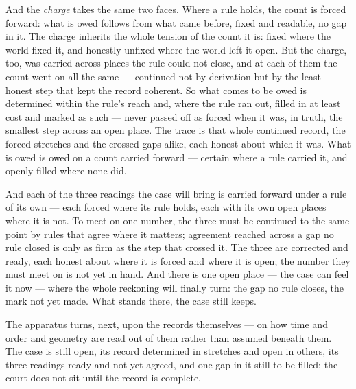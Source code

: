 And the \emph{charge} takes the same two faces. Where a rule holds, the count is forced forward: what is owed
follows from what came before, fixed and readable, no gap in it. The charge inherits the whole tension of the
count it is: fixed where the world fixed it, and honestly unfixed where the world left it open. But the charge, too, was carried across places
the rule could not close, and at each of them the count went on all the same --- continued not by derivation but
by the least honest step that kept the record coherent. So what comes to be owed is determined within the rule's
reach and, where the rule ran out, filled in at least cost and marked as such --- never passed off as forced
when it was, in truth, the smallest step across an open place. The trace is that whole continued record, the
forced stretches and the crossed gaps alike, each honest about which it was. What is owed is owed on a count
carried forward --- certain where a rule carried it, and openly filled where none did.

And each of the three readings the case will bring is carried forward under a rule of its own --- each forced
where its rule holds, each with its own open places where it is not. To meet on one number, the three must be
continued to the same point by rules that agree where it matters; agreement reached across a gap no rule closed
is only as firm as the step that crossed it. The three are corrected and ready, each honest about where it is
forced and where it is open; the number they must meet on is not yet in hand. And there is one open place --- the
case can feel it now --- where the whole reckoning will finally turn: the gap no rule closes, the mark not yet
made. What stands there, the case still keeps.

The apparatus turns, next, upon the records themselves --- on how time and order and geometry are read out of
them rather than assumed beneath them. The case is still open, its record determined in stretches and open in
others, its three readings ready and not yet agreed, and one gap in it still to be filled; the court does not
sit until the record is complete.

